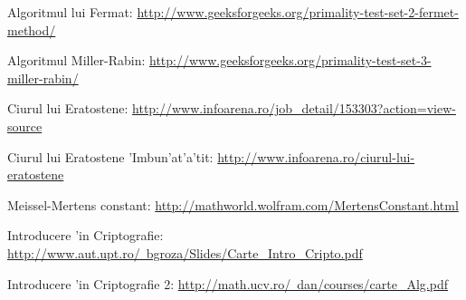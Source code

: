 \documentclass[12pt,twoside]{article}
\numberwithin{figure}{section}
\begin{document}
\newpage
{}
\begin{thebibliography}{9}
 


\bibitem{}
Algoritmul lui Fermat:
\hypertarget{1}{}
\href{http://www.geeksforgeeks.org/primality-test-set-2-fermet-method/}{http://www.geeksforgeeks.org/primality-test-set-2-fermet-method/}


\bibitem{}
Algoritmul Miller-Rabin:
\hypertarget{2}{}
\href{http://www.geeksforgeeks.org/primality-test-set-3-miller-rabin/}{http://www.geeksforgeeks.org/primality-test-set-3-miller-rabin/}







\bibitem{}
Ciurul lui Eratostene:
\hypertarget{3}{}
\href{http://www.infoarena.ro/job\_detail/153303?action=view-source}{http://www.infoarena.ro/job\_detail/153303?action=view-source}

\bibitem{}
Ciurul lui Eratostene 'Imbun'at'a'tit:
\hypertarget{4}{}
\href{http://www.infoarena.ro/ciurul-lui-eratostene}{http://www.infoarena.ro/ciurul-lui-eratostene}


\bibitem{}
Meissel-Mertens constant:
\hypertarget{5}{}
\href{http://mathworld.wolfram.com/MertensConstant.html}{http://mathworld.wolfram.com/MertensConstant.html}

\bibitem{}
Introducere 'in Criptografie:
\hypertarget{6}{}
\href{http://www.aut.upt.ro/~bgroza/Slides/Carte\_Intro\_Cripto.pdf}{http://www.aut.upt.ro/~bgroza/Slides/Carte\_Intro\_Cripto.pdf}


\bibitem{}
Introducere 'in Criptografie 2:
\hypertarget{6}{}
\href{http://math.ucv.ro/~dan/courses/carte\_Alg.pdf}{http://math.ucv.ro/~dan/courses/carte\_Alg.pdf}







\end{thebibliography}
\end{document}
